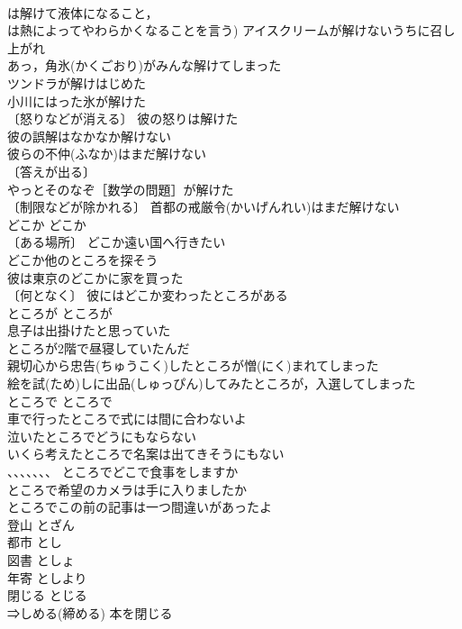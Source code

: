 \documentclass[8pt]{extreport}
\begin{document}
\begin{CJK}{UTF8}{min}
\\	は解けて液体になること，
\\	は熱によってやわらかくなることを言う) アイスクリームが解けないうちに召し上がれ 
\\	あっ，角氷(かくごおり)がみんな解けてしまった 
\\	ツンドラが解けはじめた 
\\	小川にはった氷が解けた 
\\	〔怒りなどが消える〕 彼の怒りは解けた 
\\	彼の誤解はなかなか解けない 
\\	彼らの不仲(ふなか)はまだ解けない 
\\	〔答えが出る〕
\\	やっとそのなぞ［数学の問題］が解けた 
\\	〔制限などが除かれる〕 首都の戒厳令(かいげんれい)はまだ解けない 
\\	どこか	どこか	
\\	〔ある場所〕 どこか遠い国へ行きたい 
\\	どこか他のところを探そう 
\\	彼は東京のどこかに家を買った 
\\	〔何となく〕 彼にはどこか変わったところがある 
\\	ところが	ところが	
\\	息子は出掛けたと思っていた
\\	ところが2階で昼寝していたんだ 
\\	親切心から忠告(ちゅうこく)したところが憎(にく)まれてしまった 
\\	絵を試(ため)しに出品(しゅっぴん)してみたところが，入選してしまった 
\\	ところで	ところで	
\\	車で行ったところで式には間に合わないよ 
\\	泣いたところでどうにもならない 
\\	いくら考えたところで名案は出てきそうにもない 
\\	、、、、、、、 ところでどこで食事をしますか 
\\	ところで希望のカメラは手に入りましたか 
\\	ところでこの前の記事は一つ間違いがあったよ 
\\	登山	とざん	
\\	都市	とし	
\\	図書	としょ	
\\	年寄	としより	
\\	閉じる	とじる	
\\	⇒しめる(締める) 本を閉じる 

\end{CJK}
\end{document}

